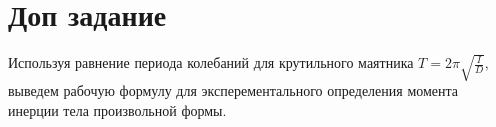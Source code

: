 \section{Доп задание}

Используя равнение периода колебаний для крутильного маятника $T = 2 \pi \sqrt{\frac{I}{D} }$,
выведем рабочую формулу для эксперементального определения момента инерции тела произвольной формы.
